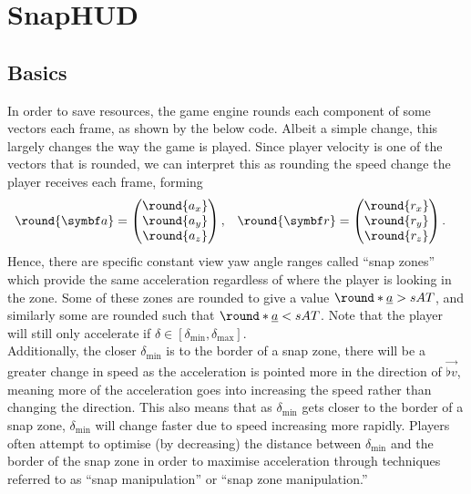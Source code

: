 \section{SnapHUD}
\label{sec:snaphud}

\subsection{Basics}
\label{sec:snap_basics}
In order to save resources, the game engine rounds each component of some vectors each frame, as shown by the below code. Albeit a simple change, this largely changes the way the game is played.
Since player velocity is one of the vectors that is rounded, we can interpret this as rounding the speed change the player receives each frame, forming
\begin{align*}
\round{\vec{a}} &=
\begin{pmatrix}
\round{a_x} \\ \round{a_y} \\ \round{a_z}
\end{pmatrix}, & \round{\vec{r}} &=
\begin{pmatrix}
\round{r_x} \\ \round{r_y} \\ \round{r_z}
\end{pmatrix}.
\end{align*}
Hence, there are specific constant view yaw angle ranges called ``snap zones'' which provide the same acceleration regardless of where the player is looking in the zone.
Some of these zones are rounded to give a value $\round*{\flat{a}} > sAT$, and similarly some are rounded such that $\round*{\flat{a}} < sAT$.
Note that the player will still only accelerate if $\delta \in [\delta_{\min}, \delta_{\max}]$.\\
Additionally, the closer $\delta_{\min}$ is to the border of a snap zone, there will be a greater change in speed as the acceleration is pointed more in the direction of $\vec{\flat{v}}$, meaning more of the acceleration goes into increasing the speed rather than changing the direction.
This also means that as $\delta_{\min}$ gets closer to the border of a snap zone, $\delta_{\min}$ will change faster due to speed increasing more rapidly.
Players often attempt to optimise (by decreasing) the distance between $\delta_{\min}$ and the border of the snap zone in order to maximise acceleration through techniques referred to as ``snap manipulation'' or ``snap zone manipulation.''\\

